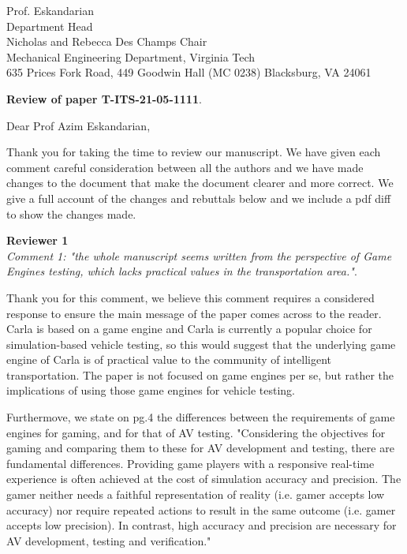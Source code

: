 \documentclass[11pt, a4paper]{letter} %
\renewcommand{\opening}[1]{
	{\centering\fromaddress\vspace{0.05\textheight} \\ %
	\hspace*{\longindentation}\today\hspace*{\fill}\par} %
	{\raggedright \toname \\ \toaddress \par} %
	\vspace{1cm} %
	\noindent #1 %
}
\begin{document}

\begin{letter}{
	Prof. Eskandarian\\
	Department Head\\ 
	Nicholas and Rebecca Des Champs Chair\\
	Mechanical Engineering Department, Virginia Tech\\
	635 Prices Fork Road, 449 Goodwin Hall (MC 0238)
	Blacksburg, VA 24061
}




\textbf{Review of paper T-ITS-21-05-1111}.

Dear Prof Azim Eskandarian,

Thank you for taking the time to review our manuscript. We have given each comment careful consideration between all the authors and we have made changes to the document that make the document clearer and more correct. We give a full account of the changes and rebuttals below and we include a pdf diff to show the changes made.

\textbf{Reviewer 1}\\
\textit{Comment 1: "the whole manuscript seems written from the perspective of Game Engines testing, which lacks practical values in the transportation area."}.

Thank you for this comment, we believe this comment requires a considered response to ensure the main message of the paper comes across to the reader. Carla is based on a game engine and Carla is currently a popular choice for simulation-based vehicle testing, so this would suggest that the underlying  game engine of Carla is of practical value to the community of intelligent transportation. The paper is not focused on game engines per se, but rather the implications of using those game engines for vehicle testing. 

Furthermove, we state on pg.4 the differences between the requirements of game engines for gaming, and for that of AV testing. "Considering the objectives for gaming and comparing them to these for AV development and testing, there are fundamental differences. Providing game players with a responsive real-time experience is often achieved at the cost of simulation accuracy and precision. The gamer neither needs a faithful representation of reality (i.e. gamer accepts low accuracy) nor require repeated actions to result in the same outcome (i.e. gamer accepts low precision). In contrast, high accuracy and precision are necessary for AV development, testing and verification." 


\end{letter}
\end{document}
